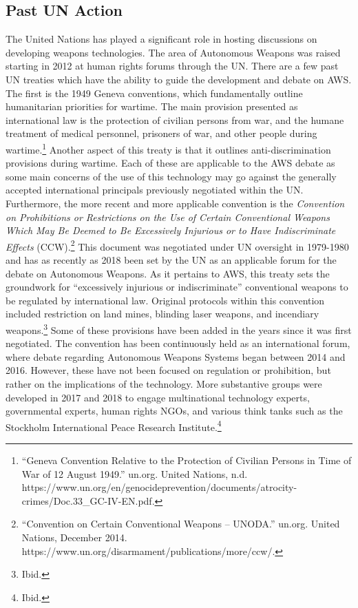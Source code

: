 \documentclass[10pt, letterpaper]{article}
\begin{document}
\subsection{Past UN Action}

The United Nations has played a significant role in hosting
discussions on developing weapons technologies. The area of Autonomous
Weapons was raised starting in 2012 at human rights forums through the
UN. There are a few past UN treaties which have the ability to guide the
development and debate on AWS. The first is the 1949 Geneva conventions,
which fundamentally outline humanitarian priorities for wartime. The
main provision presented as international law is the protection of
civilian persons from war, and the humane treatment of medical
personnel, prisoners of war, and other people during wartime.\footnote{``Geneva
  Convention Relative to the Protection of Civilian Persons in Time of
  War of 12 August 1949.'' un.org. United Nations, n.d.
  https://www.un.org/en/genocideprevention/documents/atrocity-crimes/Doc.33\_GC-IV-EN.pdf.}
Another aspect of this treaty is that it outlines anti-discrimination
provisions during wartime. Each of these are applicable to the AWS
debate as some main concerns of the use of this technology may go
against the generally accepted international principals previously
negotiated within the UN. \\

Furthermore, the more recent and more applicable convention is the
\emph{Convention on Prohibitions or Restrictions on the Use of Certain
Conventional Weapons Which May Be Deemed to Be Excessively Injurious or
to Have Indiscriminate Effects} (CCW).\footnote{``Convention on Certain
  Conventional Weapons -- UNODA.'' un.org. United Nations, December
  2014. https://www.un.org/disarmament/publications/more/ccw/.} This
document was negotiated under UN oversight in 1979-1980 and has as
recently as 2018 been set by the UN as an applicable forum for the
debate on Autonomous Weapons. As it pertains to AWS, this treaty sets
the groundwork for ``excessively injurious or indiscriminate''
conventional weapons to be regulated by international law. Original
protocols within this convention included restriction on land mines,
blinding laser weapons, and incendiary weapons.\footnote{Ibid.} Some of
these provisions have been added in the years since it was first
negotiated. The convention has been continuously held as an
international forum, where debate regarding Autonomous Weapons Systems
began between 2014 and 2016. However, these have not been focused on
regulation or prohibition, but rather on the implications of the
technology. More substantive groups were developed in 2017 and 2018 to
engage multinational technology experts, governmental experts, human
rights NGOs, and various think tanks such as the Stockholm International
Peace Research Institute.\footnote{Ibid.} \\
\end{document}
